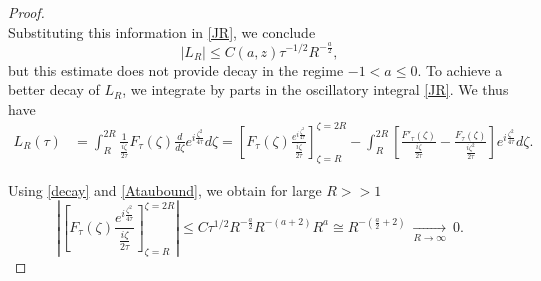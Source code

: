 \documentclass[11pt,letter]{amsart}
\numberwithin{equation}{section}
\numberwithin{equation}{section}
\begin{document}
\begin{proof}
\begin{equation}
\end{equation}
Substituting this information in \eqref{JR}, we conclude 
\[
|L_R| \le C(a,z) \tau^{-1/2} R^{-\frac{a}2},
\]
but this estimate does not provide decay in the regime $-1<a\le 0$.
 To achieve a better decay of $L_R$, we integrate by parts in the oscillatory integral \eqref{JR}.
 We thus have
\begin{align*}
L_R(\tau) & =\int_R^{2R} \frac{1}{\frac{i\zeta}{2\tau} } F_\tau(\zeta) \frac{d}{d\zeta} e^{i \frac{\zeta^2}{4\tau}} d\zeta = \left[F_\tau(\zeta)  \frac{e^{i \frac{\zeta^2}{4\tau}}}{\frac{i\zeta}{2\tau} }\right]_{\zeta = R}^{\zeta = 2R} - \int_R^{2R} \left[\frac{F'_\tau(\zeta)}{\frac{i\zeta}{2\tau}} - \frac{F_\tau(\zeta)}{\frac{i\zeta^2}{2\tau}}\right] e^{i \frac{\zeta^2}{4\tau}}d\zeta.
\end{align*}
 
 Using \eqref{decay} and \eqref{Ataubound}, we obtain for large $R>>1$
\[
\left|\left[F_\tau(\zeta)  \frac{e^{i \frac{\zeta^2}{4\tau}}}{\frac{i\zeta}{2\tau} }\right]_{\zeta = R}^{\zeta = 2R}\right| \le C \tau^{1/2} R^{-\frac a2} R^{-(a+2)}R^a \cong R^{-(\frac a2+2)}\ \underset{R\to \infty}{\longrightarrow}\ 0.
\]


 
 

\end{proof}
\end{document}
